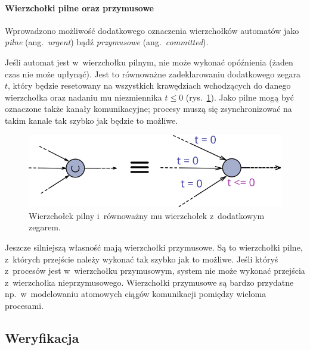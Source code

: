 \documentclass{pracamgr}
\newcommand{\ang}[1]{(ang.~\emph{#1})}
\newcommand{\imgr}[1]{rys.~\ref{#1}}
\theoremstyle{plain}
\begin{document}
\paragraph{Wierzchołki pilne oraz przymusowe} Wprowadzono możliwość
dodatkowego oznaczenia wierzchołków automatów jako \emph{pilne}
\ang{urgent} bądź \emph{przymusowe} \ang{committed}.

Jeśli automat jest w~wierzchołku pilnym, nie może wykonać opóźnienia
(żaden czas nie może upłynąć). Jest to równoważne zadeklarowaniu
dodatkowego zegara $t$, który będzie resetowany na wszystkich
krawędziach wchodzących do danego wierzchołka oraz nadaniu mu
niezmiennika $t \leq 0$ (\imgr{img:uppaal-urgent}). Jako pilne mogą być
oznaczone także kanały komunikacyjne; procesy muszą się
zsynchronizować na takim kanale tak szybko jak będzie to możliwe.

\begin{figure}[h]
  \centering
  \includegraphics[width=.5\textwidth]{img/uppaal-urgent}
  \caption{Wierzchołek pilny i~równoważny mu wierzchołek z~dodatkowym
    zegarem.}
  \label{img:uppaal-urgent}
\end{figure}

Jeszcze silniejszą własność mają wierzchołki przymusowe. Są to
wierzchołki pilne, z~których przejście należy wykonać tak szybko jak
to możliwe. Jeśli któryś z~procesów jest w~wierzchołku przymusowym,
system nie może wykonać przejścia z~wierzchołka nieprzymusowego.
Wierzchołki przymusowe są bardzo przydatne np.~w~modelowaniu atomowych
ciągów komunikacji pomiędzy wieloma procesami.

\subsection{Weryfikacja}
\end{document}
